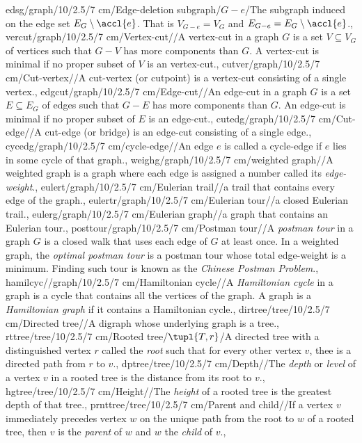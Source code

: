 edsg/graph/10/2.5/7 cm/{Edge-deletion subgraph}/{$G-e$}/{The subgraph induced on the edge set $E_G\setminus\accl{e}$. That is $V_{G-e}=V_G$ and $E_{G-e}=E_G\setminus\accl{e}$.},
vercut/graph/10/2.5/7 cm/{Vertex-cut}/{}/{A vertex-cut in a graph $G$ is a set $V\subseteq V_G$ of vertices such that $G-V$ has more components than $G$. A vertex-cut is minimal if no proper subset of $V$ is an vertex-cut.},
cutver/graph/10/2.5/7 cm/{Cut-vertex}/{}/{A cut-vertex (or cutpoint) is a vertex-cut consisting of a single vertex.},
edgcut/graph/10/2.5/7 cm/{Edge-cut}/{}/{An edge-cut in a graph $G$ is a set $E\subseteq E_G$ of edges such that $G-E$ has more components than $G$. An edge-cut is minimal if no proper subset of $E$ is an edge-cut.},
cutedg/graph/10/2.5/7 cm/{Cut-edge}/{}/{A cut-edge (or bridge) is an edge-cut consisting of a single edge.},
cycedg/graph/10/2.5/7 cm/{cycle-edge}/{}/{An edge $e$ is called a cycle-edge if $e$ lies in some cycle of that graph.},
weighg/graph/10/2.5/7 cm/{weighted graph}/{}/{A weighted graph is a graph where each edge is assigned a number called its \emph{edge-weight}.},
eulert/graph/10/2.5/7 cm/{Eulerian trail}/{}/{a trail that contains every edge of the graph.},
eulertr/graph/10/2.5/7 cm/{Eulerian tour}/{}/{a closed Eulerian trail.},
eulerg/graph/10/2.5/7 cm/{Eulerian graph}/{}/{a graph that contains an Eulerian tour.},
posttour/graph/10/2.5/7 cm/{Postman tour}/{}/{A \emph{postman tour} in a graph $G$ is a closed walk that uses each edge of $G$ at least once. In a weighted graph, the \emph{optimal postman tour} is a postman tour whose total edge-weight is a minimum. Finding such tour is known as the \emph{Chinese Postman Problem}.},
hamilcyc//graph/10/2.5/7 cm/{Hamiltonian cycle}/{}/{A \emph{Hamiltonian cycle} in a graph is a cycle that contains all the vertices of the graph. A graph is a \emph{Hamiltonian graph} if it contains a Hamiltonian cycle.},
dirtree/tree/10/2.5/7 cm/{Directed tree}/{}/{A digraph whose underlying graph is a tree.},
rttree/tree/10/2.5/7 cm/{Rooted tree}/{$\tupl{T,r}$}/{A directed tree with a distinguished vertex $r$ called the \emph{root} such that for every other vertex $v$, thee is a directed path from $r$ to $v$.},
dptree/tree/10/2.5/7 cm/{Depth}/{}/{The \emph{depth} or \emph{level} of a vertex $v$ in a rooted tree is the distance from its root to $v$.},
hgtree/tree/10/2.5/7 cm/{Height}/{}/{The \emph{height} of a rooted tree is the greatest depth of that tree.},
prnttree/tree/10/2.5/7 cm/{Parent and child}/{}/{If a vertex $v$ immediately precedes vertex $w$ on the unique path from the root to $w$ of a rooted tree, then $v$ is the \emph{parent} of $w$ and $w$ the \emph{child} of $v$.},
